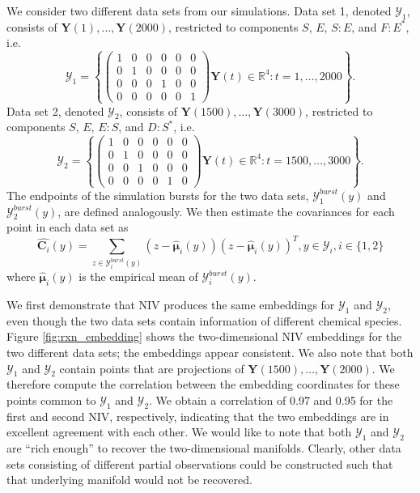 \documentclass[aip,jcp,preprint]{revtex4-1}
\begin{document}
We consider two different data sets from our simulations.
%
Data set 1, denoted $\mathcal{Y}_1$, consists of $\mathbf{Y}(1), \dots, \mathbf{Y}(2000)$, restricted to components $S$, $E$, $S:E$, and $F:E^{*}$, i.e.
$$\mathcal{Y}_1 = \left\{
\left( \begin{array}{cccccc}
1 & 0 & 0 & 0 & 0 & 0 \\
0 & 1 & 0 & 0 & 0 & 0 \\
0 & 0 & 0 & 1 & 0 & 0 \\
0 & 0 & 0 & 0 & 0 & 1
\end{array} \right) \mathbf{Y}(t) \in \mathbb{R}^4: t=1, \dots, 2000 \right\}.$$
%
Data set 2, denoted $\mathcal{Y}_2$, consists of $\mathbf{Y}(1500), \dots, \mathbf{Y}(3000)$, restricted to components $S$, $E$, $E:S$, and $D:S^{*}$, i.e.
$$\mathcal{Y}_2 = \left\{
\left( \begin{array}{cccccc}
1 & 0 & 0 & 0 & 0 & 0 \\
0 & 1 & 0 & 0 & 0 & 0 \\
0 & 0 & 1 & 0 & 0 & 0 \\
0 & 0 & 0 & 0 & 1 & 0
\end{array} \right)
\mathbf{Y}(t) \in \mathbb{R}^4: t=1500, \dots, 3000 \right\}.$$
%
The endpoints of the simulation bursts for the two data sets, $\mathcal{Y}^{burst}_1(y)$ and $\mathcal{Y}^{burst}_2(y)$, are defined analogously.
%
We then estimate the covariances for each point in each data set as
\begin{equation}
\widehat{\mathbf{C}_i}(y) = \sum_{z \in \mathcal{Y}^{burst}_i(y)} \left( z - \hat{\mathbf{\mu}}_i(y) \right)\left( z - \hat{\mathbf{\mu}}_i(y) \right)^T, y \in \mathcal{Y}_i, i \in \{1, 2\}
\end{equation}
where $\hat{\mathbf{\mu}}_i(y)$ is the empirical mean of $\mathcal{Y}^{burst}_i(y)$.

We first demonstrate that NIV produces the same embeddings for $\mathcal{Y}_1$ and $\mathcal{Y}_2$, even though the two data sets contain information of different chemical species.
%
Figure \ref{fig:rxn_embedding} shows the two-dimensional NIV embeddings for the two different data sets; the embeddings appear consistent.
%
We also note that both $\mathcal{Y}_1$ and $\mathcal{Y}_2$ contain points that are projections of $\mathbf{Y}(1500), \dots, \mathbf{Y}(2000)$.
%
We therefore compute the correlation between the embedding coordinates for these points common to $\mathcal{Y}_1$ and $\mathcal{Y}_2$.
%
We obtain a correlation of 0.97 and 0.95 for the first and second NIV, respectively, indicating that the two embeddings are in excellent agreement with each other.
%
We would like to note that both $\mathcal{Y}_1$ and $\mathcal{Y}_2$ are ``rich enough'' to recover the two-dimensional manifolds.
%
Clearly, other data sets consisting of different partial observations could be constructed such that that underlying manifold would not be recovered.
\end{document}
